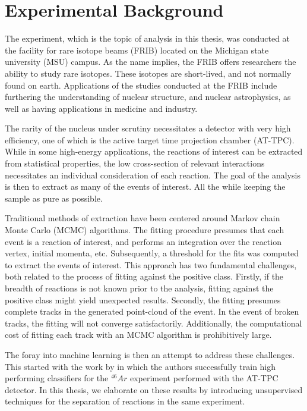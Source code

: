 \chapter{Experimental Background}\label{ch:experimental}

The experiment, which is the topic of analysis in this thesis, was conducted at the facility for rare isotope beams (FRIB) located on the Michigan state university (MSU) campus. As the name implies, the FRIB offers researchers the ability to study rare isotopes. These isotopes are short-lived, and not normally found on earth. Applications of the studies conducted at the FRIB include furthering the understanding of nuclear structure, and nuclear astrophysics, as well as having applications in medicine and industry. 

The rarity of the nucleus under scrutiny necessitates a detector with very high efficiency, one of which is the active target time projection chamber (AT-TPC). While in some high-energy applications, the reactions of interest can be extracted from statistical properties, the low cross-section of relevant interactions necessitates an individual consideration of each reaction. The goal of the analysis is then to extract as many of the events of interest. All the while keeping the sample as pure as possible. 

Traditional methods of extraction have been centered around Markov chain Monte Carlo (MCMC) algorithms. The fitting procedure presumes that each event is a reaction of interest, and performs an integration over the reaction vertex, initial momenta, etc. Subsequently, a threshold for the fits was computed to extract the events of interest. This approach has two fundamental challenges, both related to the process of fitting against the positive class. Firstly, if the breadth of reactions is not known prior to the analysis, fitting against the positive class might yield unexpected results. Secondly, the fitting presumes complete tracks in the generated point-cloud of the event. In the event of broken tracks, the fitting will not converge satisfactorily. Additionally, the computational cost of fitting each track with an MCMC algorithm is prohibitively large. 

The foray into machine learning is then an attempt to address these challenges. This started with the work by \cite{Kuchera2019} in which the authors successfully train high performing classifiers for the ${}^{46}Ar$ experiment performed with the AT-TPC detector. In this thesis, we elaborate on these results by introducing unsupervised techniques for the separation of reactions in the same experiment.